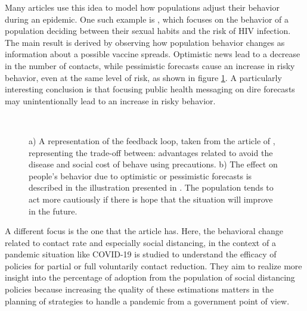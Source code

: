 Many articles use this idea to model how populations adjust their behavior during an epidemic. One such example is  \cite{Auld_2003}, which focuses on the behavior of a population deciding between their sexual habits and the risk of HIV infection. The main result is derived by observing how population behavior changes as information about a possible vaccine spreads. Optimistic news lead to a decrease in the number of contacts, while pessimistic forecasts cause an increase in risky behavior, even at the same level of risk, as shown in figure \ref{fig:abm_game}. A particularly interesting conclusion is that focusing public health messaging on dire forecasts may unintentionally lead to an increase in risky behavior.

\begin{figure}[h]
	\centering
	 \quad
	 \\
	\caption[Game theory]{a) A representation of the feedback loop, taken from the article of \cite{Wang_2015}, representing the trade-off between: advantages related to avoid the disease and social cost of behave using precautions.  b) The effect on people's behavior due to optimistic or pessimistic forecasts is described in the illustration presented in \cite{Auld_2003}. The population tends to act more cautiously if there is hope that the situation will improve in the future.}
	\label{fig:abm_game}
\end{figure}

A different focus is the one that the article  \cite{Gosak_2021_game} has. Here, the behavioral change related to contact rate and especially social distancing, in the context of a pandemic situation like COVID-19  is studied to understand the efficacy of policies for partial or full voluntarily contact reduction. They aim to realize more insight into the percentage of adoption from the population of social distancing policies because increasing the quality of these estimations matters in the planning of strategies to handle a pandemic from a government point of view.

